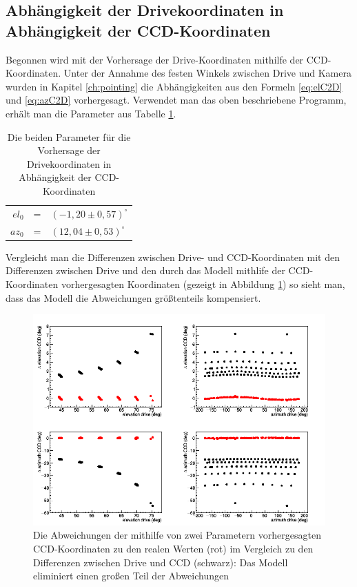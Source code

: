 \subsection{Abhängigkeit der Drivekoordinaten in Abhängigkeit der CCD-Koordinaten}
Begonnen wird mit der Vorhersage der Drive-Koordinaten mithilfe der CCD-Koordinaten. Unter der Annahme des festen Winkels zwischen Drive und Kamera wurden in Kapitel \ref{ch:pointing} die Abhängigkeiten aus den Formeln \ref{eq:elC2D} und \ref{eq:azC2D} vorhergesagt. Verwendet man das oben beschriebene Programm, erhält man die Parameter aus Tabelle \ref{tab:C2D}.
\begin{table}[htbp]
\centering
\begin{tabular}{rcl}
\toprule
$el_0$ &=& $(-1,20\pm0,57)^{\circ}$\\
$az_0$ &=& $(12,04\pm0,53)^{\circ}$\\
\bottomrule
\end{tabular}
\caption{Die beiden Parameter für die Vorhersage der Drivekoordinaten in Abhängigkeit der CCD-Koordinaten}
\label{tab:C2D}
\end{table}
Vergleicht man die Differenzen zwischen Drive- und CCD-Koordinaten mit den Differenzen zwischen Drive und den durch das Modell mithlife der CCD-Koordinaten vorhergesagten Koordinaten (gezeigt in Abbildung \ref{img:C2Dcomp}) so sieht man, dass das Modell die Abweichungen größtenteils kompensiert.
\begin{figure}[htbp]
\centering
\includegraphics[width=\textwidth]{../341/C2Dcomp.png}
\caption{Die Abweichungen der mithilfe von zwei Parametern vorhergesagten CCD-Koordinaten zu den realen Werten (rot) im Vergleich zu den Differenzen zwischen Drive und CCD (schwarz): Das Modell eliminiert einen großen Teil der Abweichungen}
\label{img:C2Dcomp}
\end{figure}
